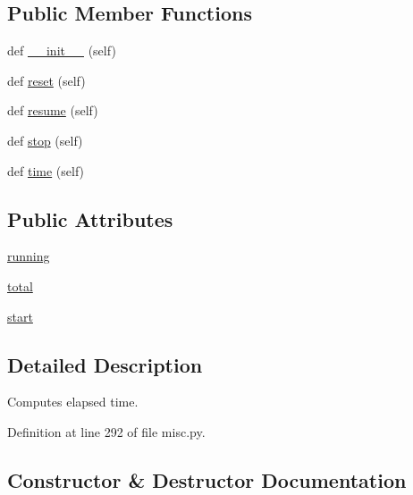 \subsection*{Public Member Functions}
\begin{DoxyCompactItemize}
\item 
def \hyperlink{classparlai_1_1utils_1_1misc_1_1Timer_ae566c74592910671655a53eafaf8f92d}{\+\_\+\+\_\+init\+\_\+\+\_\+} (self)
\item 
def \hyperlink{classparlai_1_1utils_1_1misc_1_1Timer_a68bdf8abb3fe00edc639b21944d03371}{reset} (self)
\item 
def \hyperlink{classparlai_1_1utils_1_1misc_1_1Timer_a855f1e8a3ba03fe16712fd7ae49dab46}{resume} (self)
\item 
def \hyperlink{classparlai_1_1utils_1_1misc_1_1Timer_a5a7a90c124ef1b1b92a550606a3c93b9}{stop} (self)
\item 
def \hyperlink{classparlai_1_1utils_1_1misc_1_1Timer_a37214d0006ae44a19081c21a5a699ffb}{time} (self)
\end{DoxyCompactItemize}
\subsection*{Public Attributes}
\begin{DoxyCompactItemize}
\item 
\hyperlink{classparlai_1_1utils_1_1misc_1_1Timer_a05abf50b49c1e26baabe03a9daafa870}{running}
\item 
\hyperlink{classparlai_1_1utils_1_1misc_1_1Timer_a37214900a663640b33bdce9e6b3053dd}{total}
\item 
\hyperlink{classparlai_1_1utils_1_1misc_1_1Timer_a1c32e2a8785377c980bc4b125fe6db0d}{start}
\end{DoxyCompactItemize}


\subsection{Detailed Description}
\begin{DoxyVerb}Computes elapsed time.\end{DoxyVerb}
 

Definition at line 292 of file misc.\+py.



\subsection{Constructor \& Destructor Documentation}
\mbox{\label{classparlai_1_1utils_1_1misc_1_1Timer_ae566c74592910671655a53eafaf8f92d}} 
